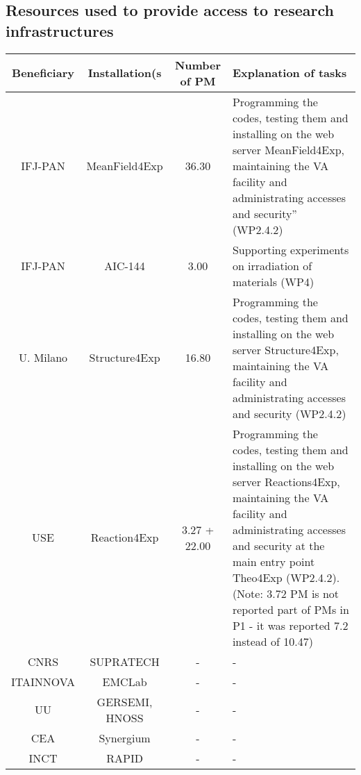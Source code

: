 %
\subsection{Resources used to provide access to research infrastructures}

\begin{table}[H]
\centering
\begin{tabularx}{\textwidth}{|c|c|c|X|} \hline
    \rowcolor{mycyan}
    {\bf Beneficiary} & {\bf Installation(s} & {\bf Number of PM}  & {\bf Explanation of tasks} \\ \hline
    IFJ-PAN & MeanField4Exp & 36.30 & Programming the codes, testing them and installing on the web server MeanField4Exp, maintaining the VA facility and administrating accesses and security” (WP2.4.2)\\ \hline
    IFJ-PAN & AIC-144 & 3.00 & Supporting experiments on irradiation of materials (WP4)\\ \hline
    U. Milano & Structure4Exp & 16.80 & Programming the codes, testing them and installing on the web server Structure4Exp, maintaining the VA facility and administrating accesses and security (WP2.4.2)\\ \hline 
   USE & Reaction4Exp & 3.27 + 22.00 & Programming the codes, testing them and installing on the web server Reactions4Exp, maintaining the VA facility and administrating accesses and security at the main entry point Theo4Exp (WP2.4.2). (Note: 3.72 PM is not reported part of PMs in P1 - it was reported 7.2 instead of 10.47) \\ \hline
   CNRS & SUPRATECH & - & - \\ \hline
   ITAINNOVA & EMCLab & - & - \\ \hline
   UU & GERSEMI, HNOSS & - & - \\ \hline
   CEA & Synergium & - & - \\ \hline
   INCT & RAPID & - & - \\ \hline
   
\end{tabularx}
\label{tab:resources}
\end{table}
